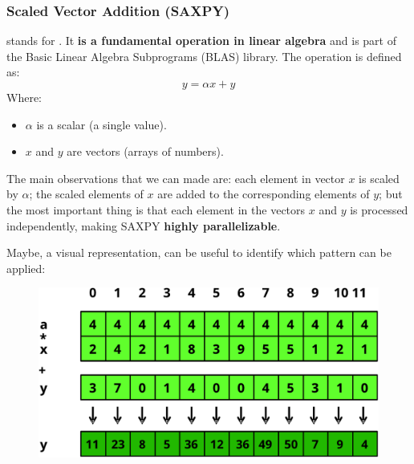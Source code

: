 \subsubsection{Scaled Vector Addition (SAXPY)}

 stands for . It \textbf{is a fundamental operation in linear algebra} and is part of the Basic Linear Algebra Subprograms (BLAS) library. The operation is defined as:
\begin{equation}
    y = \alpha x + y
\end{equation}
Where:
\begin{itemize}
    \item $\alpha$ is a scalar (a single value).
    \item $x$ and $y$ are vectors (arrays of numbers).
\end{itemize}
The main observations that we can made are: each element in vector $x$ is scaled by $\alpha$; the scaled elements of $x$ are added to the corresponding elements of $y$; but the most important thing is that each element in the vectors $x$ and $y$ is processed independently, making SAXPY \textbf{highly parallelizable}.

\highspace
Maybe, a visual representation, can be useful to identify which pattern can be applied:
\begin{figure}[!htp]
    \centering
    \includegraphics[width=.8\textwidth]{img/saxpy-1.pdf}
\end{figure}


